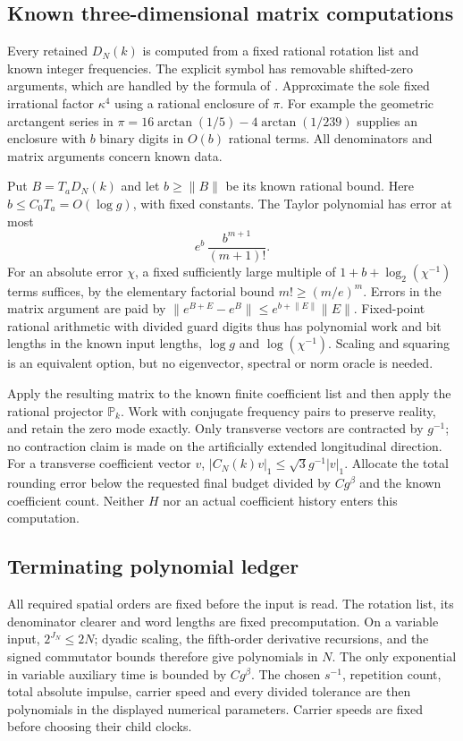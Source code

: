 \documentclass[11pt,a4paper]{amsart}
\theoremstyle{definition}
\theoremstyle{remark}
\numberwithin{equation}{section}
\newcommand{\PP}{\mathbb P}
\newcommand{\norm}[1]{\lVert #1\rVert}
\begin{document}
\subsection{Known three-dimensional matrix computations}
Every retained $D_N(k)$ is computed from a fixed rational rotation
list and known integer frequencies.  The explicit symbol has removable
shifted-zero arguments, which are handled by the formula of
\cite[Lemma~4.2]{Common}.  Approximate the sole fixed irrational
factor $\kappa^4$ using a rational enclosure of $\pi$.
For example the geometric arctangent series in
$\pi=16\arctan(1/5)-4\arctan(1/239)$ supplies an enclosure with
$b$ binary digits in $O(b)$ rational terms.
All denominators and matrix arguments concern known data.

Put $B=T_aD_N(k)$ and let $b\ge\norm B$ be its known rational bound.
Here $b\le C_0T_a=O(\log g)$, with fixed constants.
The Taylor polynomial has error at most
\[
 e^b\,\frac{b^{m+1}}{(m+1)!}.
\]
For an absolute error $\chi$, a fixed sufficiently large multiple
of $1+b+\log_2(\chi^{-1})$ terms suffices, by the elementary factorial
bound $m!\ge(m/e)^m$.
Errors in the matrix argument are paid by
$\norm{e^{B+E}-e^B}\le e^{b+\norm E}\norm E$.
Fixed-point rational arithmetic with divided guard digits thus
has polynomial work and bit lengths in the known input lengths,
$\log g$ and $\log(\chi^{-1})$.  Scaling and squaring is an
equivalent option, but no eigenvector, spectral or norm oracle
is needed.

Apply the resulting matrix to the known finite coefficient list and
then apply the rational projector $\PP_k$.  Work with conjugate
frequency pairs to preserve reality, and retain the zero mode exactly.
Only transverse vectors are contracted by $g^{-1}$; no contraction
claim is made on the artificially extended longitudinal direction.
For a transverse coefficient vector $v$,
$|C_N(k)v|_1\le\sqrt3g^{-1}|v|_1$.
Allocate the total rounding error below the requested final budget
divided by $Cg^\beta$ and the known coefficient count.
Neither $H$ nor an actual coefficient history enters this computation.

\subsection{Terminating polynomial ledger}
All required spatial orders are fixed before the input is read.
The rotation list, its denominator clearer and word lengths are fixed
precomputation.  On a variable input, $2^{J_N}\le2N$; dyadic scaling,
the fifth-order derivative recursions, and the signed commutator bounds
therefore give polynomials in $N$.  The only exponential in variable
auxiliary time is bounded by $Cg^\beta$.
The chosen $s^{-1}$, repetition count, total absolute impulse,
carrier speed and every divided tolerance are then polynomials in
the displayed numerical parameters.  Carrier speeds are fixed before
choosing their child clocks.
\end{document}
